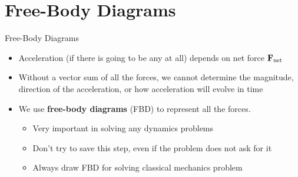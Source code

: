 \documentclass[12pt,compress,aspectratio=169]{beamer}
\newcommand{\pic}[2]{\texttt{[image: \#2]}}
\newcommand{\mb}[1]{\ensuremath\mathbf{#1}}
\newcommand{\eq}[2]{\vspace{#1}{\Large\begin{displaymath}#2\end{displaymath}}}
\begin{document}
%
%
%
%  
%



\section{Free-Body Diagrams}

\begin{frame}{Free-Body Diagrams}
  \begin{itemize}
  \item Acceleration (if there is going to be any at all) depends
    on net force $\mb{F}_\mathrm{net}$
  \item Without a vector sum of all the forces, we cannot determine the
    magnitude, direction of the acceleration, or how acceleration will evolve
    in time
  \item We use \textbf{free-body diagrams} (FBD) to represent all the forces.
    \begin{itemize}
    \item Very important in solving any dynamics problems
    \item Don't try to save this step, even if the problem does not ask for it
    \item Always draw FBD for solving classical mechanics problem
    \end{itemize}
  \end{itemize}
\end{frame}
\end{document}
